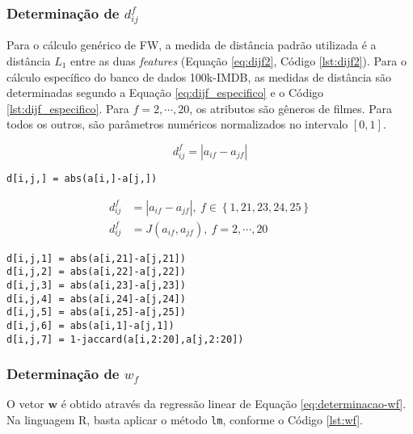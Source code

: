 \subsubsection{Determinação de $d_{ij}^f$} %
\label{ssub:determina_o_de_d__ij_f_}

Para o cálculo genérico de FW, a medida de distância padrão utilizada é a distância $L_1$ entre as duas \textit{features} (Equação \ref{eq:dijf2}, Código \ref{lst:dijf2}). Para o cálculo específico do banco de dados 100k-IMDB, as medidas de distância são determinadas segundo a Equação \ref{eq:dijf_especifico} e o Código \ref{lst:dijf_especifico}. Para $f=2,\cdots,20$, os atributos são gêneros de filmes. Para todos os outros, são parâmetros numéricos normalizados no intervalo $[0,1]$.

\begin{equation}
\label{eq:dijf2}
d_{ij}^f = \left|a_{if} - a_{jf}\right|
\end{equation}

\begin{lstlisting}[caption=Determinação de $d_{ij}^f$ genérico,label=lst:dijf2]
d[i,j,] = abs(a[i,]-a[j,])
\end{lstlisting}

\begin{equation}
\label{eq:dijf_especifico}
\begin{split}
d_{ij}^f &= \left|a_{if} - a_{jf}\right|,~f \in \left\{1,21,23,24,25\right\} \\
d_{ij}^f &= J(a_{if},a_{jf}),~f = 2, \cdots, 20
\end{split}
\end{equation}


\begin{lstlisting}[caption=Determinação de $d_{ij}^f$ específico,label=lst:dijf_especifico]
d[i,j,1] = abs(a[i,21]-a[j,21])  
d[i,j,2] = abs(a[i,22]-a[j,22])  
d[i,j,3] = abs(a[i,23]-a[j,23])  
d[i,j,4] = abs(a[i,24]-a[j,24])  
d[i,j,5] = abs(a[i,25]-a[j,25])  
d[i,j,6] = abs(a[i,1]-a[j,1])    
d[i,j,7] = 1-jaccard(a[i,2:20],a[j,2:20])
\end{lstlisting}

\subsubsection{Determinação de $w_f$} %
\label{ssub:determina_o_de_w_f_}

O vetor $\mathbf{w}$ é obtido através da regressão linear de Equação \ref{eq:determinacao-wf}. Na linguagem R, basta aplicar o método \texttt{lm}, conforme  o Código \ref{lst:wf}.


